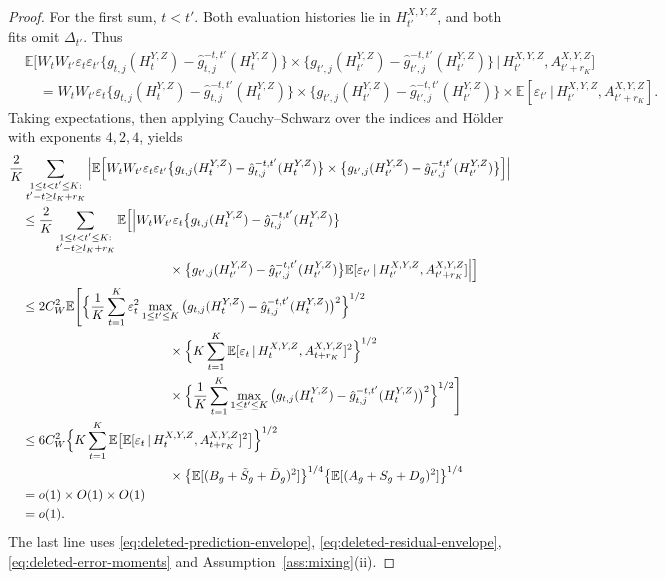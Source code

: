 \documentclass[12pt]{article}
\def\E{\mathbb{E}}
\newcommand\given{\,|\,}
\numberwithin{equation}{section}
\begin{document}
\begin{proof}
For the first sum, \(t<t'\). Both evaluation histories lie in
\(H_{t'}^{X,Y,Z}\), and both fits omit \(\Delta_{t'}\).
Thus
\begin{align*}
&\E\Big[
W_tW_{t'}\varepsilon_t\varepsilon_{t'}
\big\{g_{t,j}(H_t^{Y,Z})
      -\hat g_{t,j}^{-t,t'}(H_t^{Y,Z})\big\}
\times
\big\{g_{t',j}(H_{t'}^{Y,Z})
      -\hat g_{t',j}^{-t,t'}(H_{t'}^{Y,Z})\big\}
\given H_{t'}^{X,Y,Z},A_{t'+r_K}^{X,Y,Z}
\Big]\\
&\quad=
W_tW_{t'}\varepsilon_t
\big\{g_{t,j}(H_t^{Y,Z})
      -\hat g_{t,j}^{-t,t'}(H_t^{Y,Z})\big\}
\times
\big\{g_{t',j}(H_{t'}^{Y,Z})
      -\hat g_{t',j}^{-t,t'}(H_{t'}^{Y,Z})\big\}\times
\E[\varepsilon_{t'}\given
H_{t'}^{X,Y,Z},A_{t'+r_K}^{X,Y,Z}].
\end{align*}
Taking expectations, then applying Cauchy--Schwarz over the indices and
H\"older with exponents \(4,2,4\), yields
\begin{align}
&\frac2K\sum_{\substack{1\leq t<t'\leq K:\\
                      t'-t\geq l_K+r_K}}
\Big|\E\Big[
W_tW_{t'}\varepsilon_t\varepsilon_{t'}
\big\{g_{t,j}(H_t^{Y,Z})
      -\hat g_{t,j}^{-t,t'}(H_t^{Y,Z})\big\}\times
\big\{g_{t',j}(H_{t'}^{Y,Z})
      -\hat g_{t',j}^{-t,t'}(H_{t'}^{Y,Z})\big\}
\Big]\Big|\notag\\
&\quad\leq
\frac2K\sum_{\substack{1\leq t<t'\leq K:\\
                      t'-t\geq l_K+r_K}}
\E\Big[\Big|
W_tW_{t'}\varepsilon_t
\big\{g_{t,j}(H_t^{Y,Z})
      -\hat g_{t,j}^{-t,t'}(H_t^{Y,Z})\big\}\notag\\*
&\hspace{44mm}{}\times
\big\{g_{t',j}(H_{t'}^{Y,Z})
      -\hat g_{t',j}^{-t,t'}(H_{t'}^{Y,Z})\big\}
\E[\varepsilon_{t'}\given
H_{t'}^{X,Y,Z},A_{t'+r_K}^{X,Y,Z}]
\Big|\Big]\notag\\
&\quad\leq2C_W^2\E\Bigg[
\Big\{\frac1K\sum_{t=1}^K\varepsilon_t^2
\max_{1\leq t'\leq K}
\big(g_{t,j}(H_t^{Y,Z})
     -\hat g_{t,j}^{-t,t'}(H_t^{Y,Z})\big)^2
\Big\}^{1/2}\notag\\*
&\hspace{44mm}{}\times
\Big\{K\sum_{t=1}^K
\E[\varepsilon_t\given
H_t^{X,Y,Z},A_{t+r_K}^{X,Y,Z}]^2
\Big\}^{1/2}\notag\\*
&\hspace{44mm}{}\times
\Big\{\frac1K\sum_{t=1}^K
\max_{1\leq t'\leq K}
\big(g_{t,j}(H_t^{Y,Z})
     -\hat g_{t,j}^{-t,t'}(H_t^{Y,Z})\big)^2
\Big\}^{1/2}
\Bigg]\notag\\
&\quad\leq6C_W^2
\Big\{K\sum_{t=1}^K
\E\big[
\E[\varepsilon_t\given
H_t^{X,Y,Z},A_{t+r_K}^{X,Y,Z}]^2
\big]\Big\}^{1/2}\notag\\*
&\hspace{44mm}{}\times
\big\{\E[(B_g+\tilde S_g+\tilde D_g)^2]\big\}^{1/4}
\big\{\E[(A_g+S_g+D_g)^2]\big\}^{1/4}\notag\\
&\quad=o(1)\times O(1)\times O(1)\notag\\
&\quad=o(1).
\label{eq:exposure-separated-bound}
\end{align}
The last line uses \eqref{eq:deleted-prediction-envelope},
\eqref{eq:deleted-residual-envelope},
\eqref{eq:deleted-error-moments}
and Assumption~\ref{ass:mixing}(ii).


\end{proof}
\end{document}
